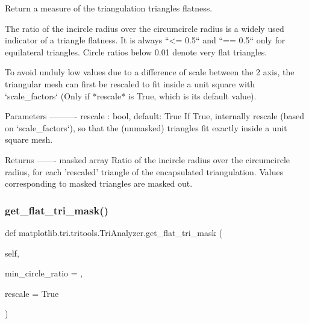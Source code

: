 \begin{DoxyVerb}Return a measure of the triangulation triangles flatness.

The ratio of the incircle radius over the circumcircle radius is a
widely used indicator of a triangle flatness.
It is always ``<= 0.5`` and ``== 0.5`` only for equilateral
triangles. Circle ratios below 0.01 denote very flat triangles.

To avoid unduly low values due to a difference of scale between the 2
axis, the triangular mesh can first be rescaled to fit inside a unit
square with `scale_factors` (Only if *rescale* is True, which is
its default value).

Parameters
----------
rescale : bool, default: True
    If True, internally rescale (based on `scale_factors`), so that the
    (unmasked) triangles fit exactly inside a unit square mesh.

Returns
-------
masked array
    Ratio of the incircle radius over the circumcircle radius, for
    each 'rescaled' triangle of the encapsulated triangulation.
    Values corresponding to masked triangles are masked out.\end{DoxyVerb}
 \mbox{\label{classmatplotlib_1_1tri_1_1tritools_1_1TriAnalyzer_a61da9fb10a28d5b0b5de2011b8a3ba27}} 
\subsubsection{\texorpdfstring{get\+\_\+flat\+\_\+tri\+\_\+mask()}{get\_flat\_tri\_mask()}}
{\footnotesize\ttfamily def matplotlib.\+tri.\+tritools.\+Tri\+Analyzer.\+get\+\_\+flat\+\_\+tri\+\_\+mask (\begin{DoxyParamCaption}\item[{}]{self,  }\item[{}]{min\+\_\+circle\+\_\+ratio = {},  }\item[{}]{rescale = {\ttfamily True} }\end{DoxyParamCaption})}

